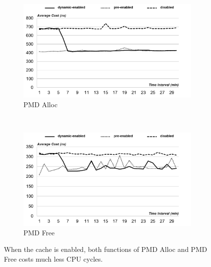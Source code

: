\begin{figure}[t!]
    \centering
    \begin{subfigure}[t]{0.5\textwidth}
        \centering
        \includegraphics[height=2.0in]{image/micro/PMDalloc.png}
        \caption{PMD Alloc}
        \label{fig:subfig:a}
    \end{subfigure}%
    ~
    \begin{subfigure}[t]{0.5\textwidth}
        \centering
        \includegraphics[height=2.0in]{image/micro/PMDfree.png}
        \caption{PMD Free}
        \label{fig:subfig:b}
    \end{subfigure}
    \caption{When the cache is enabled, both functions of PMD Alloc and PMD Free costs much less CPU cycles.}
    \label{fig:PMDtime}
\end{figure}


